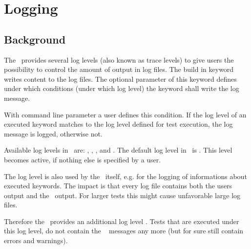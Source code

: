 %
%
%

\chapter{Logging}

\section{Background}

The \rfwcore\ provides several log levels (also known as trace levels) to give users the possibility to control the amount of output in log files.
The build in keyword  writes content to the log files. The optional parameter  of this keyword defines under which conditions
(under which log level) the  keyword shall write the log message.

With command line parameter  a user defines this condition. If the log level of an executed  keyword matches to the
log level defined for test execution, the log message is logged, otherwise not.

Available log levels in \rfwcore\ are: , , ,  and .
The default log level in \rfwcore\ is . This level becomes active, if nothing else is specified by a user.

The log level  is also used by the \rfwcore\ itself, e.g. for the logging of informations about executed keywords.
The impact is that every log file contains both the users output and the \rfwcore\ output.
For larger tests this might cause unfavorable large log files.

Therefore the \rfw\ provides an additional log level . Tests that are executed under this log level, do not contain
the \rfwcore\  messages any more (but for sure still contain errors and warnings).

